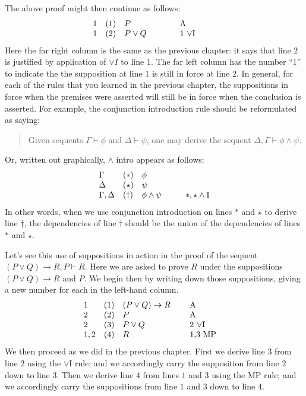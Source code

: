 The above proof might then continue as follows:
\[ \begin{array}{l l
     >{$}p{2cm}<{$} p{1.5cm}}
     1 & (1) & P  & A \\ 
     1 & (2) & P\vee Q & 1 $\vee$I \end{array} \] Here the far right column is the same as
the previous chapter: it says that line $2$ is justified by
application of $\vee I$ to line $1$.  The far left column has the
number ``$1$'' to indicate the the supposition at line $1$ is still in
force at line $2$.  In general, for each of the rules that you learned
in the previous chapter, the suppositions in force when the premises
were asserted will still be in force when the conclusion is asserted.
For example, the conjunction introduction rule should be reformulated as
saying:
\begin{quote} Given sequents $\Gamma\vdash\phi$ and
  $\Delta\vdash\psi$, one may derive the sequent $\Delta
  ,\Gamma\vdash\phi\wedge\psi$. \end{quote} Or, written out graphically, $\wedge$ intro
appears as follows:
\[ \begin{array}{l l >{$}p{1.5cm}<{$} l}
  \Gamma & (\ast ) & \phi   \\
  \Delta & (\star ) & \psi \\
  \Gamma ,\Delta & (\dagger ) & \phi \wedge \psi & \ast ,\star
                                                 \wedge\mathrm{I}   
   \end{array} \]
In other words, when we use conjunction introduction on lines $\ast$
and $\star$ to derive line $\dagger$, the dependencies of line
$\dagger$ should be the union of the dependencies of lines $\ast$ and
$\star$.

Let's see this use of suppositions in action in the proof of the
sequent $(P\vee Q)\to R,P\vdash R$.  Here we are asked to prove $R$
under the suppositions $(P\vee Q)\to R$ and $P$.  We begin then by
writing down those suppositions, giving a new number for each in the
left-hand column.
\[ \begin{array}{l l >{$}p{2.5cm}<{$} p{1.5cm}}
  1 & (1) & (P\vee Q)\to R &  A \\
  2 & (2) & P & A \\
  2 & (3) & P\vee Q & 2 $\vee$I \\
  1,2 & (4) & R  & 1,3 MP \end{array} \]
We then proceed as we did in the previous chapter.  First we derive
line $3$ from line $2$ using the $\vee$I rule; and we accordingly
carry the supposition from line $2$ down to line $3$.  Then we derive
line $4$ from lines $1$ and $3$ using the MP rule; and we accordingly
carry the suppositions from line $1$ and $3$ down to line $4$.

